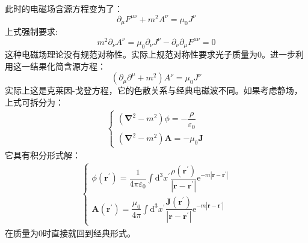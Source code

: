 \documentclass[12pt, a4paper, oneside]{ctexart}
\begin{document}
	\quad\quad 此时的电磁场含源方程变为了：
	\begin{equation}
		\partial_{\mu}F^{\mu\nu}+m^{2}A^{\nu}=\mu_{0}J^{\nu}
	\end{equation}
	\quad\quad 上式强制要求:
	\begin{equation}
		m^{2}\partial_{\nu}A^{\nu}=\mu_{0}\partial_{\nu}J^{\nu}-\partial_{\nu}\partial_{\mu}F^{\mu\nu}=0
	\end{equation}
	\quad\quad 这种电磁场理论没有规范对称性。实际上规范对称性要求光子质量为$0$。进一步利用这一结果化简含源方程：
	\begin{equation}
		(\partial_{\mu}\partial^{\mu}+m^{2})A^{\nu}=\mu_{0}J^{\nu}
	\end{equation}
	\quad\quad 实际上这是克莱因-戈登方程，它的色散关系与经典电磁波不同。如果考虑静场，上式可拆分为：
	\begin{equation}
		\begin{aligned}
			\begin{cases}
				(\boldsymbol{\nabla}^{2}-m^{2})\phi = -\dfrac{\rho}{\varepsilon_{0}} \\
				(\boldsymbol{\nabla}^{2}-m^{2})\boldsymbol{A} = -\mu_{0}\boldsymbol{J}
			\end{cases}
		\end{aligned}
	\end{equation}\quad\quad
	它具有积分形式解：
	\begin{equation}
		\begin{aligned}
			\begin{cases}
				\phi(\boldsymbol{r^{'}}) = \dfrac{1}{4\pi\varepsilon_{0}}\displaystyle\int\mathrm{d}^{3}x^{'}\dfrac{\rho(\boldsymbol{r^{'}})}{\left|\boldsymbol{r}-\boldsymbol{r^{'}}\right|}\mathrm{e}^{-m\left|\boldsymbol{r}-\boldsymbol{r^{'}}\right|} \\
				\boldsymbol{A}(\boldsymbol{r^{'}}) = \dfrac{\mu_{0}}{4\pi}\displaystyle\int\mathrm{d}^{3}x^{'}\dfrac{\boldsymbol{J}(\boldsymbol{r^{'}})}{\left|\boldsymbol{r}-\boldsymbol{r^{'}}\right|}\mathrm{e}^{-m\left|\boldsymbol{r}-\boldsymbol{r^{'}}\right|}
			\end{cases}
		\end{aligned}
	\end{equation}
	\quad\quad 在质量为$0$时直接就回到经典形式。
\end{document}
